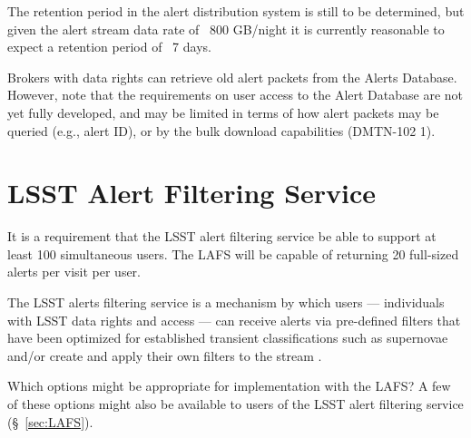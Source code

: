 \documentclass[DM,lsstdraft,authoryear,toc]{lsstdoc}
\begin{document}
The retention period in the alert distribution system is still to be determined, but given the alert stream data rate of ~800 GB/night it is currently reasonable to expect a retention period of ~7 days.

Brokers with data rights can retrieve old alert packets from the Alerts Database. However, note that the requirements on user access to the Alert Database are not yet fully developed, and may be limited in terms of how alert packets may be queried (e.g., alert ID), or by the bulk download capabilities (DMTN-102 1).

\section{LSST Alert Filtering Service}\label{sec:lafs}

It is a requirement that the LSST alert filtering service be able to support at least 100 simultaneous users. The LAFS will be capable of returning 20 full-sized alerts per visit per user.

The LSST alerts filtering service is a mechanism by which users --- individuals with LSST data rights and access --- can receive alerts via pre-defined filters that have been optimized for established transient classifications such as supernovae and/or create and apply their own filters to the stream . 

Which options might be appropriate for implementation with the LAFS?
A few of these options might also be available to users of the LSST alert filtering service (\S~\ref{sec:LAFS}).



\end{document}
